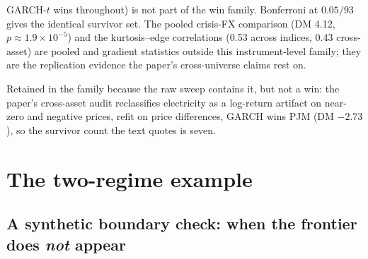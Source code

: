 \documentclass[11pt]{article}
\begin{document}
\begin{table}[htbp]
\begin{threeparttable}
\begin{tablenotes}
GARCH-$t$ wins throughout) is not part of the win family. Bonferroni
at $0.05/93$ gives the identical survivor set. The pooled crisis-FX
comparison (DM 4.12, $p\approx1.9\times10^{-5}$) and the
kurtosis--edge correlations (0.53 across indices, 0.43 cross-asset)
are pooled and gradient statistics outside this instrument-level
family; they are the replication evidence the paper's cross-universe
claims rest on.
\item[a] Retained in the family because the raw sweep contains it,
but not a win: the paper's cross-asset audit reclassifies electricity
as a log-return artifact on near-zero and negative prices, refit on price differences, GARCH wins PJM (DM $-2.73$), so the survivor count the text quotes is seven.
\end{tablenotes}
\end{threeparttable}
\end{table}

\clearpage
\section{The two-regime example}
\subsection*{A synthetic boundary check: when the frontier does
\emph{not} appear}\label{sec:toy}
\end{document}
